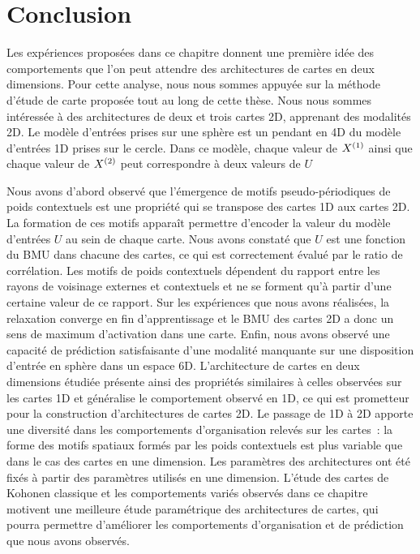 \documentclass[../main]{subfiles}
\begin{document}
\section{Conclusion}

Les expériences proposées dans ce chapitre donnent une première idée des comportements que l'on peut attendre des architectures de cartes en deux dimensions.
Pour cette analyse, nous nous sommes appuyée sur la méthode d'étude de carte proposée tout au long de cette thèse.
Nous nous sommes intéressée à des architectures de deux et trois cartes 2D, apprenant des modalités 2D. Le modèle d'entrées prises sur une sphère est un pendant en 4D du modèle d'entrées 1D prises sur le cercle. Dans ce modèle, chaque valeur de $X^{({1})}$ ainsi que chaque valeur de $X^{({2})}$ peut correspondre à deux valeurs de $U$

Nous avons d'abord observé que l'émergence de motifs pseudo-périodiques de poids contextuels est une propriété qui se transpose des cartes 1D aux cartes 2D. 
La formation de ces motifs apparaît permettre d'encoder la valeur du modèle d'entrées $U$ au sein de chaque carte. Nous avons constaté que $U$ est une fonction du BMU dans chacune des cartes, ce qui est correctement évalué par le ratio de corrélation.
Les motifs de poids contextuels dépendent du rapport entre les rayons de voisinage externes et contextuels et ne se forment qu'à partir d'une certaine valeur de ce rapport.
Sur les expériences que nous avons réalisées, la relaxation converge en fin d'apprentissage et le BMU des cartes 2D a donc un sens de maximum d'activation dans une carte. Enfin, nous avons observé une capacité de prédiction satisfaisante d'une modalité manquante sur une disposition d'entrée en sphère dans un espace 6D.
L'architecture de cartes en deux dimensions étudiée présente ainsi des propriétés similaires à celles observées sur les cartes 1D et généralise le comportement observé en 1D, ce qui est prometteur pour la construction d'architectures de cartes 2D. Le passage de 1D à 2D apporte une diversité dans les comportements d'organisation relevés sur les cartes~: la forme des motifs spatiaux formés par les poids contextuels est plus variable que dans le cas des cartes en une dimension.
Les paramètres des architectures ont été fixés à partir des paramètres utilisés en une dimension. L'étude des cartes de Kohonen classique et les comportements variés observés dans ce chapitre motivent une meilleure étude paramétrique des architectures de cartes, qui pourra permettre d'améliorer les comportements d'organisation et de prédiction que nous avons observés.
\end{document}
